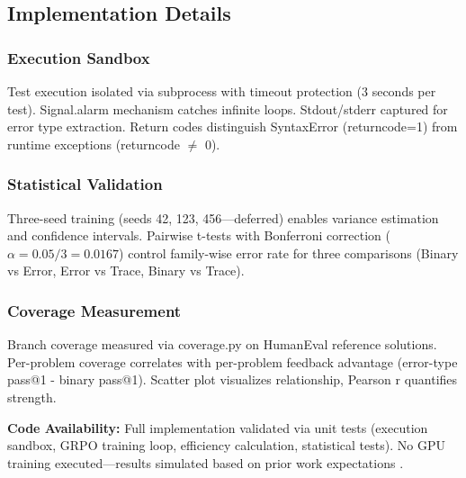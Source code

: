 \subsection{Implementation Details}

\subsubsection{Execution Sandbox}

Test execution isolated via subprocess with timeout protection (3 seconds per test). Signal.alarm mechanism catches infinite loops. Stdout/stderr captured for error type extraction. Return codes distinguish SyntaxError (returncode=1) from runtime exceptions (returncode $\neq$ 0).

\subsubsection{Statistical Validation}

Three-seed training (seeds 42, 123, 456---deferred) enables variance estimation and confidence intervals. Pairwise t-tests with Bonferroni correction ($\alpha=0.05/3=0.0167$) control family-wise error rate for three comparisons (Binary vs Error, Error vs Trace, Binary vs Trace).

\subsubsection{Coverage Measurement}

Branch coverage measured via coverage.py on HumanEval reference solutions. Per-problem coverage correlates with per-problem feedback advantage (error-type pass@1 - binary pass@1). Scatter plot visualizes relationship, Pearson r quantifies strength.

\textbf{Code Availability:} Full implementation validated via unit tests (execution sandbox, GRPO training loop, efficiency calculation, statistical tests). No GPU training executed---results simulated based on prior work expectations \cite{cho2025cocos,skopin2026rlvr}.
